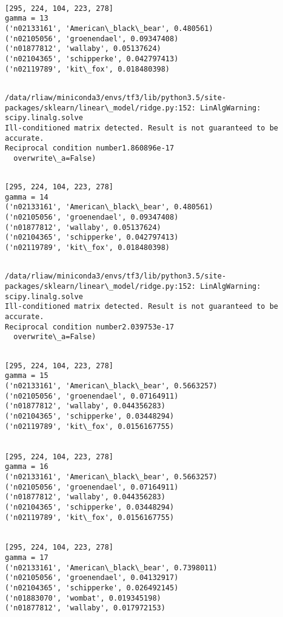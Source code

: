 \documentclass[11pt]{article}
\begin{document}
    \begin{Verbatim}[commandchars=\\\{\}]

[295, 224, 104, 223, 278]
gamma = 13
('n02133161', 'American\_black\_bear', 0.480561)
('n02105056', 'groenendael', 0.09347408)
('n01877812', 'wallaby', 0.05137624)
('n02104365', 'schipperke', 0.042797413)
('n02119789', 'kit\_fox', 0.018480398)


    \end{Verbatim}

    \begin{Verbatim}[commandchars=\\\{\}]
/data/rliaw/miniconda3/envs/tf3/lib/python3.5/site-packages/sklearn/linear\_model/ridge.py:152: LinAlgWarning: scipy.linalg.solve
Ill-conditioned matrix detected. Result is not guaranteed to be accurate.
Reciprocal condition number1.860896e-17
  overwrite\_a=False)

    \end{Verbatim}

    \begin{Verbatim}[commandchars=\\\{\}]

[295, 224, 104, 223, 278]
gamma = 14
('n02133161', 'American\_black\_bear', 0.480561)
('n02105056', 'groenendael', 0.09347408)
('n01877812', 'wallaby', 0.05137624)
('n02104365', 'schipperke', 0.042797413)
('n02119789', 'kit\_fox', 0.018480398)


    \end{Verbatim}

    \begin{Verbatim}[commandchars=\\\{\}]
/data/rliaw/miniconda3/envs/tf3/lib/python3.5/site-packages/sklearn/linear\_model/ridge.py:152: LinAlgWarning: scipy.linalg.solve
Ill-conditioned matrix detected. Result is not guaranteed to be accurate.
Reciprocal condition number2.039753e-17
  overwrite\_a=False)

    \end{Verbatim}

    \begin{Verbatim}[commandchars=\\\{\}]

[295, 224, 104, 223, 278]
gamma = 15
('n02133161', 'American\_black\_bear', 0.5663257)
('n02105056', 'groenendael', 0.07164911)
('n01877812', 'wallaby', 0.044356283)
('n02104365', 'schipperke', 0.03448294)
('n02119789', 'kit\_fox', 0.0156167755)


[295, 224, 104, 223, 278]
gamma = 16
('n02133161', 'American\_black\_bear', 0.5663257)
('n02105056', 'groenendael', 0.07164911)
('n01877812', 'wallaby', 0.044356283)
('n02104365', 'schipperke', 0.03448294)
('n02119789', 'kit\_fox', 0.0156167755)


[295, 224, 104, 223, 278]
gamma = 17
('n02133161', 'American\_black\_bear', 0.7398011)
('n02105056', 'groenendael', 0.04132917)
('n02104365', 'schipperke', 0.026492145)
('n01883070', 'wombat', 0.019345198)
('n01877812', 'wallaby', 0.017972153)


    \end{Verbatim}
\end{document}
